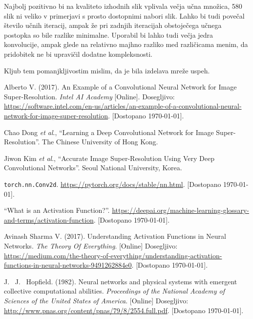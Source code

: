 \documentclass[a4paper,11pt]{article}
\begin{document}
Najbolj pozitivno bi na kvaliteto izhodnih slik vplivala večja učna množica, 580 slik ni veliko v primerjavi s prosto dostopnimi nabori
	slik.\cite{datasets}
Lahko bi tudi povečal število učnih iteracij, ampak že pri zadnjih iteracijah obstoječega učnega postopka so bile razlike minimalne.
Uporabil bi lahko tudi večja jedra konvolucije, ampak glede na relativno majhno razliko med različicama menim, da pridobitek ne bi upravičil dodatne
	kompleksnosti.

Kljub tem pomanjkljivostim mislim, da je bila izdelava mreže uspeh.

\begin{thebibliography}{99}


 Alberto V\@. (2017). An Example of a Convolutional Neural Network for Image Super-Resolution.
	\emph{Intel AI Academy} [Online]. Dosegljivo:
	\url{https://software.intel.com/en-us/articles/an-example-of-a-convolutional-neural-network-for-image-super-resolution}.
	[Dostopano \today].

 Chao Dong \emph{et al}., ``Learning a Deep Convolutional Network for Image Super-Resolution''. The Chinese University of Hong Kong.

 Jiwon Kim \emph{et al}., ``Accurate Image Super-Resolution Using Very Deep Convolutional Networks''.
	Seoul National University, Korea.

 \texttt{torch.nn.Conv2d}. \url{https://pytorch.org/docs/stable/nn.html}. [Dostopano \today].

 ``What is an Activation Function?''. \url{https://deepai.org/machine-learning-glossary-and-terms/activation-function}.
	[Dostopano \today].

 Avinash Sharma V\@. (2017). Understanding Activation Functions in Neural Networks. \emph{The Theory Of Everything}.
	[Online] Dosegljivo: \url{https://medium.com/the-theory-of-everything/understanding-activation-functions-in-neural-networks-9491262884e0}.
	[Dostopano \today].

 J.~ J.~ Hopfield. (1982). Neural networks and physical systems with emergent collective computational abilities.
	\emph{Proceedings of the National Academy of Sciences of the United States of America}. [Online] Dosegljivo:
	\url{http://www.pnas.org/content/pnas/79/8/2554.full.pdf}. [Dostopano \today].


\end{thebibliography}
\end{document}
